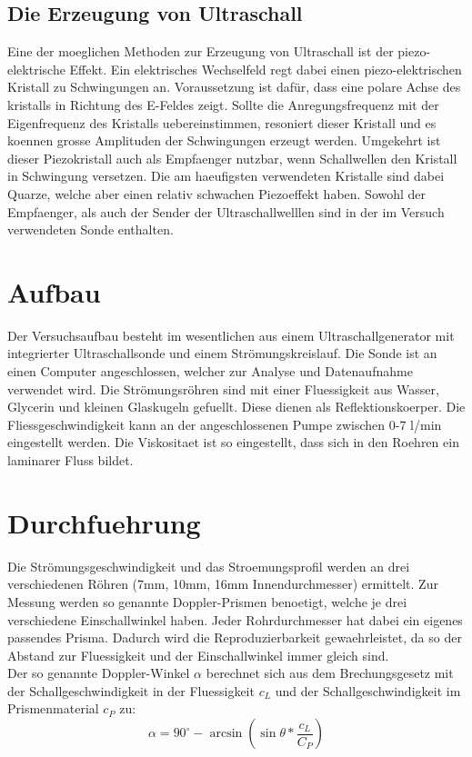 \documentclass[titlepage=firstcover, captions=tableheading]{scrartcl}
\begin{document}
\subsection{Die Erzeugung von Ultraschall}
Eine der moeglichen Methoden zur Erzeugung von Ultraschall ist der piezo-elektrische Effekt. Ein elektrisches Wechselfeld regt dabei einen piezo-elektrischen Kristall zu Schwingungen an. Voraussetzung ist dafür, dass eine polare Achse des kristalls in Richtung des E-Feldes zeigt. Sollte die Anregungsfrequenz mit der Eigenfrequenz des Kristalls uebereinstimmen, resoniert dieser Kristall und es koennen grosse Amplituden der Schwingungen erzeugt werden.
Umgekehrt ist dieser Piezokristall auch als Empfaenger nutzbar, wenn Schallwellen den Kristall in Schwingung versetzen. Die am haeufigsten verwendeten Kristalle sind dabei Quarze, welche aber einen relativ schwachen Piezoeffekt haben. Sowohl der Empfaenger, als auch der Sender der Ultraschallwelllen sind in der im Versuch verwendeten Sonde enthalten. 
\section{Aufbau}
Der Versuchsaufbau besteht im wesentlichen aus einem Ultraschallgenerator mit integrierter Ultraschallsonde und einem Strömungskreislauf. Die Sonde ist an einen Computer angeschlossen, welcher zur Analyse und Datenaufnahme verwendet wird. Die Strömungsröhren sind mit einer Fluessigkeit aus Wasser, Glycerin und kleinen Glaskugeln gefuellt. Diese dienen als Reflektionskoerper. Die Fliessgeschwindigkeit kann an der angeschlossenen Pumpe zwischen 0-7 l/min eingestellt werden. Die Viskositaet ist so eingestellt, dass sich in den Roehren ein laminarer Fluss bildet.
\section{Durchfuehrung}
Die Strömungsgeschwindigkeit und das Stroemungsprofil werden an drei verschiedenen Röhren (7mm, 10mm, 16mm Innendurchmesser) ermittelt. Zur Messung werden so genannte Doppler-Prismen benoetigt, welche je drei verschiedene Einschallwinkel haben. Jeder Rohrdurchmesser hat dabei ein eigenes passendes Prisma. Dadurch wird die Reproduzierbarkeit gewaehrleistet, da so der Abstand zur Fluessigkeit und der Einschallwinkel immer gleich sind.\\
Der so genannte Doppler-Winkel $\alpha$ berechnet sich aus dem Brechungsgesetz mit der Schallgeschwindigkeit in der Fluessigkeit $c_L$ und der Schallgeschwindigkeit im Prismenmaterial $c_P$ zu:
\begin{equation}
    \alpha=90^\circ-\arcsin(\sin\theta*\frac{c_L}{C_P})
\end{equation}
\end{document}
